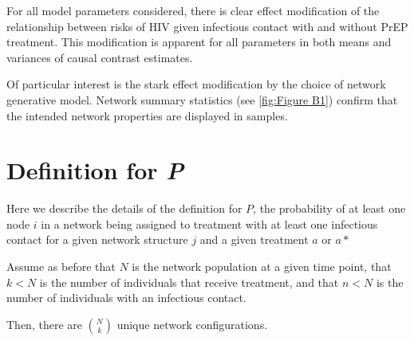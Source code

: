 \documentclass{article}
\theoremstyle{definition}
\begin{document}
For all model parameters considered, there is clear effect modification of the relationship between risks of HIV given infectious contact with and without PrEP treatment. This modification is apparent for all parameters in both means and variances of causal contrast estimates.

Of particular interest is the stark effect modification by the choice of network generative model. Network summary statistics (see \ref{fig:Figure B1}) confirm that the intended network properties are displayed in samples.  


\appendix
{}
\section{Definition for \textit{P}}
Here we describe the details of the definition for $P$, the probability of at least one node $i$ in a network being assigned to treatment with at least one infectious contact for a given network structure $j$ and a given treatment $a$ or $a*$

Assume as before that $N$ is the network population at a given time point, that $k<N$ is the number of individuals that receive treatment, and that $n<N$ is the number of individuals with an infectious contact.

 Then, there are $\binom{N}{k}$ unique network configurations.
 
\end{document}
